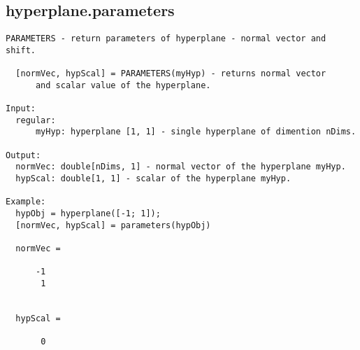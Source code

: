 \subsection{\texorpdfstring{hyperplane.parameters}{parameters}}\label{method:hyperplane.parameters}
\begin{verbatim}
PARAMETERS - return parameters of hyperplane - normal vector and shift.

  [normVec, hypScal] = PARAMETERS(myHyp) - returns normal vector
      and scalar value of the hyperplane.

Input:
  regular:
      myHyp: hyperplane [1, 1] - single hyperplane of dimention nDims.

Output:
  normVec: double[nDims, 1] - normal vector of the hyperplane myHyp.
  hypScal: double[1, 1] - scalar of the hyperplane myHyp.

Example:
  hypObj = hyperplane([-1; 1]);
  [normVec, hypScal] = parameters(hypObj)

  normVec =

      -1
       1


  hypScal =

       0
\end{verbatim}
